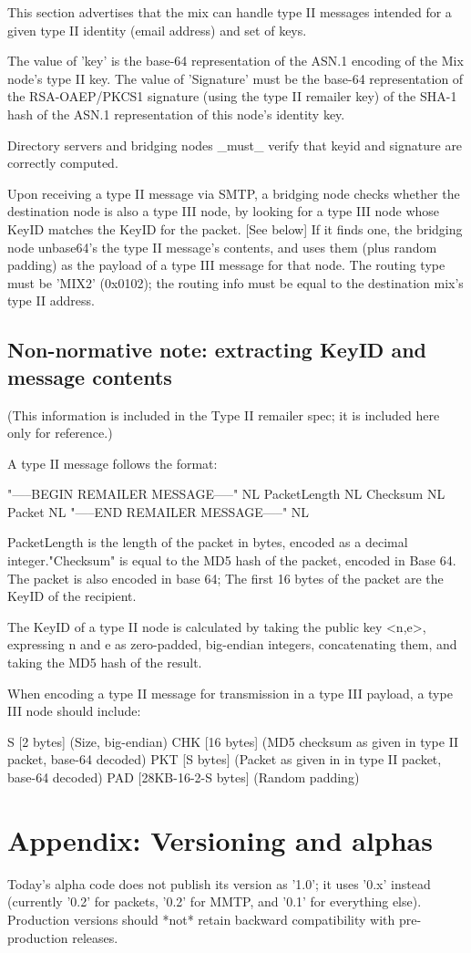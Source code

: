 This section advertises that the mix can handle type II messages
intended for a given type II identity (email address) and set of keys.

The value of 'key' is the base-64 representation of the ASN.1 encoding
of the Mix node's type II key. The value of 'Signature' must be the
base-64 representation of the RSA-OAEP/PKCS1 signature (using the
type II remailer key) of the SHA-1 hash of the ASN.1 representation of
this node's identity key.

Directory servers and bridging nodes _must_ verify that keyid and
signature are correctly computed.

Upon receiving a type II message via SMTP, a bridging node checks
whether the destination node is also a type III node, by looking for a
type III node whose KeyID matches the KeyID for the packet. [See below]
If it finds one, the bridging node unbase64's the type II message's 
contents, and uses them (plus random padding) as the payload
of a type III message for that node.  The routing type must be 'MIX2'
(0x0102); the routing info must be equal to the destination mix's
type II address.

\subsection{Non-normative note: extracting KeyID and message contents}

(This information is included in the Type II remailer spec; it is included
here only for reference.)

A type II message follows the format:

"-----BEGIN REMAILER MESSAGE-----" NL
PacketLength NL
Checksum NL
Packet NL
"-----END REMAILER MESSAGE-----" NL

PacketLength is the length of the packet in bytes, encoded as a
decimal integer."Checksum" is equal to the MD5 hash of the packet,
encoded in Base 64.  The packet is also encoded in base 64; The first
16 bytes of the packet are the KeyID of the recipient.

The KeyID of a type II node is calculated by taking the public key
<n,e>, expressing n and e as zero-padded, big-endian integers,
concatenating them, and taking the MD5 hash of the result.

When encoding a type II message for transmission in a type III payload,
a type III node should include:

S   [2 bytes] (Size, big-endian)
CHK [16 bytes] (MD5 checksum as given in type II packet, base-64 decoded)
PKT [S bytes] (Packet as given in in type II packet, base-64 decoded)
PAD [28KB-16-2-S bytes] (Random padding)

\section{Appendix: Versioning and alphas}

Today's alpha code does not publish its version as '1.0'; it uses
'0.x' instead (currently '0.2' for packets, '0.2' for MMTP, and '0.1'
for everything else).  Production versions should *not* retain
backward compatibility with pre-production releases.
